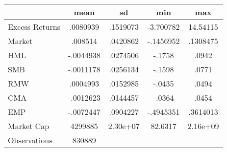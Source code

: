 {
\def\sym#1{\ifmmode^{#1}\else\(^{#1}\)\fi}
\begin{tabular}{l*{1}{cccc}}
\hline\hline
                    &        mean&          sd&         min&         max\\
\hline
Excess Returns      &    .0080939&    .1519073&   -3.700782&    14.54115\\
Market              &     .008514&    .0420862&   -.1456952&    .1308475\\
HML                 &   -.0044938&    .0274506&      -.1758&       .0942\\
SMB                 &   -.0011178&    .0256134&      -.1598&       .0771\\
RMW                 &    .0004993&    .0152985&      -.0435&       .0494\\
CMA                 &   -.0012623&    .0144457&      -.0364&       .0454\\
EMP                 &   -.0072447&    .0904227&   -.4945351&    .3614013\\
Market Cap          &     4299885&    2.30e+07&     82.6317&    2.16e+09\\
\hline
Observations        &      830889&            &            &            \\
\hline\hline
\end{tabular}
}
